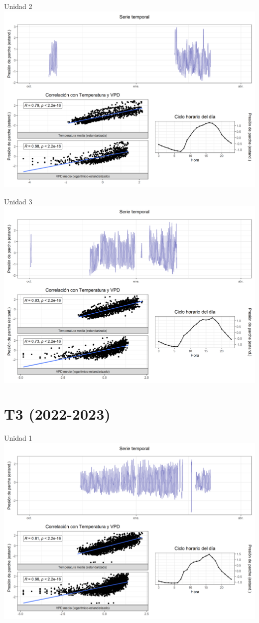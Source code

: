 \documentclass[
  letterpaper,
  DIV=11,
  numbers=noendperiod]{scrreprt}
\begin{document}
Unidad 2
\includegraphics{figuras/04_turgor_unidad/2022_2023_Rio_Claro_T2_Unidad_2.png}

Unidad 3
\includegraphics{figuras/04_turgor_unidad/2022_2023_Rio_Claro_T2_Unidad_3.png}

\chapter{T3 (2022-2023)}

Unidad 1
\includegraphics{figuras/04_turgor_unidad/2022_2023_Rio_Claro_T3_Unidad_1.png}
\end{document}
